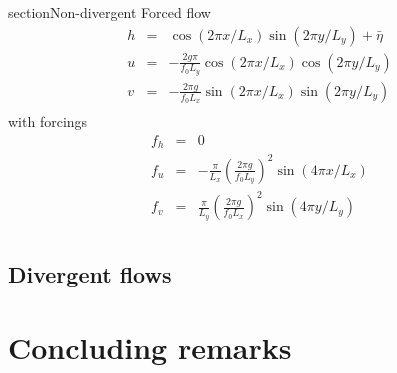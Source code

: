 \documentclass[10pt,a4paper]{article}
\begin{document}
section{Non-divergent Forced flow }
\begin{eqnarray}
h&=&\cos(2 \pi x/L_x)\sin(2\pi y /L_y) + \bar{\eta}\\
u&=&-\frac{2 g \pi}{f_0 L_y} \cos(2\pi x/L_x) \cos(2\pi y /L_y)\\
v&=& -\frac{2 \pi g}{f_0 L_x} \sin(2\pi x/L_x) \sin(2\pi y/L_y)\\
\end{eqnarray}
with forcings
\begin{eqnarray}
f_h&=&0\\
f_u&=&-\frac{\pi}{L_x}\left(\frac{2 \pi g}{f_0 L_y}\right)^2 \sin(4\pi x/L_x)\\
f_v&=& \frac{\pi}{L_y}\left(\frac{2 \pi g}{f_0 L_x}\right)^2 \sin(4\pi y/L_y)\\
\end{eqnarray}

\subsection{Divergent flows}


\section{Concluding remarks}





\appendix
\end{document}
